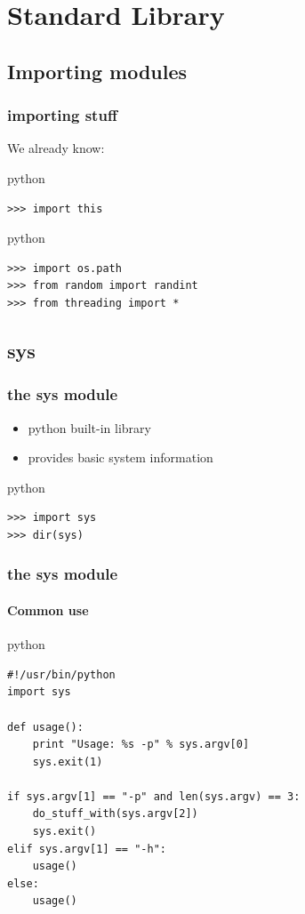 \documentclass{beamer}
\begin{document}
	
\section{Standard Library}
\subsection{Importing modules}

\begin{frame}[fragile]
	\frametitle{importing stuff}
	We already know:
	\begin{exampleblock}{python}
	\begin{lstlisting}
>>> import this
	\end{lstlisting}
	\end{exampleblock}

\pause

	\begin{exampleblock}{python}
	\begin{lstlisting}
>>> import os.path
>>> from random import randint
>>> from threading import *
	\end{lstlisting}
	\end{exampleblock}
\end{frame}

\subsection{sys} 
\begin{frame}[fragile]
    \frametitle{the sys module}
    \begin{itemize}
    \item python built-in library
    \item provides basic system information
    \end{itemize}

    \begin{exampleblock}{python}
    \begin{lstlisting}
>>> import sys
>>> dir(sys)
    \end{lstlisting}
    \end{exampleblock}
\end{frame}

\begin{frame}[fragile]
	\frametitle{the sys module}
	\framesubtitle{Common use}
    \begin{exampleblock}{python}
    \begin{lstlisting}
#!/usr/bin/python
import sys

def usage():
    print "Usage: %s -p" % sys.argv[0]
    sys.exit(1)

if sys.argv[1] == "-p" and len(sys.argv) == 3:
    do_stuff_with(sys.argv[2])
    sys.exit()
elif sys.argv[1] == "-h":
    usage()
else:
    usage()
	\end{lstlisting}
    \end{exampleblock}
\end{frame}
\end{document}
